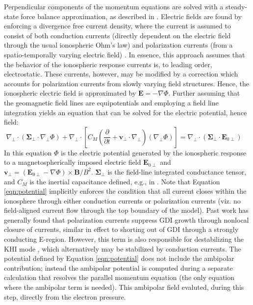 \documentclass[11pt,letterpaper]{article}
\begin{document}
Perpendicular components of the momentum equations are solved with a steady-state force balance approximation, as described in \citet{Zettergren:2012}.  Electric fields are found by enforcing a divergence free current density, where the current is assumed to consist of both conduction currents (directly dependent on the electric field through the usual ionospheric Ohm's law) and polarization currents (from a spatio-temporally varying electric field) \citep[c.f.][ and references therein]{Mitchell:1985,Gondarenko:1999}.  In essence, this approach assumes that the behavior of the ionospheric response currents is, to leading order, electrostatic.  These currents, however, may be modified by a correction which accounts for polarization currents from slowly varying field structures.  Hence, the ionospheric electric field is approximated by $\mathbf{E}=-\nabla \Phi$.  Further assuming that the geomagnetic field lines are equipotentials and employing a field line integration yields an equation that can be solved for the electric potential, hence field:
\begin{equation}
  \nabla_\perp \cdot \left( \boldsymbol{\Sigma}_\perp \cdot \nabla_\perp \Phi \right) + \nabla_\perp \cdot \left[ C_M \left( \frac{\partial}{\partial t}  + \mathbf{v}_\perp \cdot \nabla_\perp \right) \left( \nabla_\perp \Phi \right) \right]  = \nabla_\perp \cdot \left( \boldsymbol{\Sigma}_\perp \cdot \mathbf{E}_{0\perp} \right) \quad \label{eqn:potential}
\end{equation}
In this equation $\Phi$ is the electric potential generated by the ionospheric response to a magnetospherically imposed electric field $\mathbf{E}_{0\perp}$ and $\mathbf{v}_\perp = \left( \mathbf{E}_{0\perp} -\nabla \Phi \right) \times \mathbf{B}/B^2$.  $\boldsymbol{\Sigma}_\perp$ is the field-line integrated conductance tensor, and $C_M$ is the inertial capacitance defined, e.g., in \citet{Mitchell:1985}.  Note that Equation \ref{eqn:potential} implicitly enforces the condition that all current closes within the ionosphere through either conduction currents or polarization currents (viz. no field-aligned current flow through the top boundary of the model).  Past work has generally found that polarization currents suppress GDI growth through nonlocal closure of currents, similar in effect to shorting out of GDI through a strongly conducting E-region.  However, this term is also responsible for destabilizing the KHI mode \citep{Keskinen:1988}, which alternatively may be stabilized by conduction currents.  The potential defined by Equation \ref{eqn:potential} does not include the ambipolar contribution; instead the ambipolar potential is computed during a separate calculation that resolves the parallel momentum equation (the only equation where the ambipolar term is needed).  This ambipolar field evaluted, during this step, directly from the electron pressure.
\end{document}
